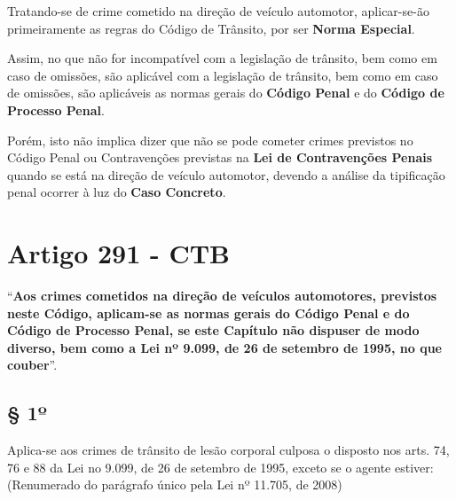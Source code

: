 \documentclass[
  letterpaper,
  DIV=11,
  numbers=noendperiod]{scrreport}
\begin{document}
Tratando-se de crime cometido na direção de veículo automotor,
aplicar-se-ão primeiramente as regras do Código de Trânsito, por ser
\textbf{Norma Especial}.

Assim, no que não for incompatível com a legislação de trânsito, bem
como em caso de omissões, são aplicável com a legislação de trânsito,
bem como em caso de omissões, são aplicáveis as normas gerais do
\textbf{Código Penal} e do \textbf{Código de Processo Penal}.

Porém, isto não implica dizer que não se pode cometer crimes previstos
no Código Penal ou Contravenções previstas na \textbf{Lei de
Contravenções Penais} quando se está na direção de veículo automotor,
devendo a análise da tipificação penal ocorrer à luz do \textbf{Caso
Concreto}.

\hypertarget{artigo-291---ctb}{%
\section{\texorpdfstring{\textbf{Artigo 291 -
CTB}}{Artigo 291 - CTB}}\label{artigo-291---ctb}}

\begin{tcolorbox}[enhanced jigsaw, titlerule=0mm, colframe=quarto-callout-important-color-frame, opacityback=0, breakable, colbacktitle=quarto-callout-important-color!10!white, left=2mm, bottomtitle=1mm, toprule=.15mm, rightrule=.15mm, arc=.35mm, leftrule=.75mm, bottomrule=.15mm, opacitybacktitle=0.6, toptitle=1mm, title=\textcolor{quarto-callout-important-color}{\faExclamation}\hspace{0.5em}{Important}, colback=white, coltitle=black]

``\textbf{Aos crimes cometidos na direção de veículos automotores,
previstos neste Código, aplicam-se as normas gerais do Código Penal e do
Código de Processo Penal, se este Capítulo não dispuser de modo diverso,
bem como a Lei nº 9.099, de 26 de setembro de 1995, no que couber}''.

\end{tcolorbox}

\hypertarget{uxba}{%
\subsection{\texorpdfstring{\textbf{§ 1º}}{§ 1º}}\label{uxba}}

Aplica-se aos crimes de trânsito de lesão corporal culposa o disposto
nos arts. 74, 76 e 88 da Lei no 9.099, de 26 de setembro de 1995, exceto
se o agente estiver: (Renumerado do parágrafo único pela Lei nº 11.705,
de 2008)
\end{document}
